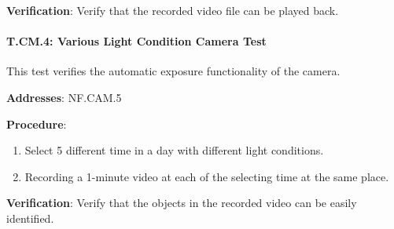 \textbf{Verification}: 
Verify that the recorded video file can be played back.

%

\paragraph{T.CM.4: Various Light Condition Camera Test}

This test verifies the automatic exposure functionality of the camera.

\textbf{Addresses}: NF.CAM.5

\textbf{Procedure}:
\begin{enumerate}[noitemsep]
    \item Select 5 different time in a day with different light conditions.
    \item Recording a 1-minute video at each of the selecting time at the same place.
\end{enumerate}

\textbf{Verification}: 
Verify that the objects in the recorded video can be easily identified.